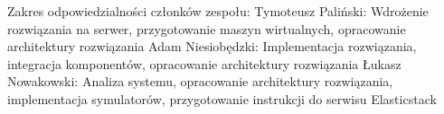 Zakres odpowiedzialności członków zespołu:
\newline Tymoteusz Paliński:
\newline Wdrożenie rozwiązania na serwer, przygotowanie maszyn wirtualnych, opracowanie architektury rozwiązania
\newline Adam Niesiobędzki: 
\newline Implementacja rozwiązania, integracja komponentów, opracowanie architektury rozwiązania
\newline Łukasz Nowakowski:
\newline Analiza systemu, opracowanie architektury rozwiązania, implementacja symulatorów, przygotowanie instrukcji do serwisu Elasticstack